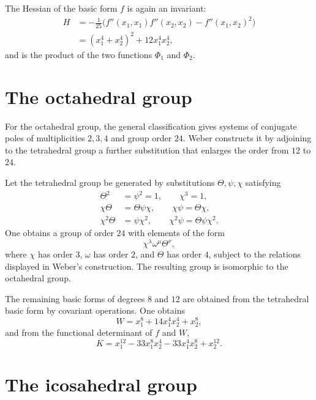 \documentclass[11pt]{article}
\begin{document}
The Hessian of the basic form $f$ is again an invariant:
\begin{align*}
 H&=-\frac1{25}\bigl(f''(x_1,x_1)f''(x_2,x_2)-f''(x_1,x_2)^2\bigr)\\
  &=(x_1^4+x_2^4)^2+12x_1^4x_2^4,
\end{align*}
and is the product of the two functions $\Phi_1$ and $\Phi_2$.

\section{The octahedral group}

For the octahedral group, the general classification gives systems of conjugate poles of multiplicities $2,3,4$ and group order $24$.  Weber constructs it by adjoining to the tetrahedral group a further substitution that enlarges the order from $12$ to $24$.

Let the tetrahedral group be generated by substitutions $\Theta,\psi,\chi$ satisfying
\begin{equation}\label{eq:w9-oct-rel}
\begin{aligned}
 \Theta^2&=\psi^2=1,
 \qquad \chi^3=1,\\
 \chi\Theta&=\Theta\psi\chi,
 \qquad \chi\psi=\Theta\chi,\\
 \chi^2\Theta&=\psi\chi^2,
 \qquad \chi^2\psi=\Theta\psi\chi^2.
\end{aligned}
\end{equation}
One obtains a group of order $24$ with elements of the form
\[
 \chi^\lambda\omega^\mu\Theta^\nu,
\]
where $\chi$ has order $3$, $\omega$ has order $2$, and $\Theta$ has order $4$, subject to the relations displayed in Weber's construction.  The resulting group is isomorphic to the octahedral group.

The remaining basic forms of degrees $8$ and $12$ are obtained from the tetrahedral basic form by covariant operations.  One obtains
\begin{equation}\label{eq:w9-oct-W}
 W=x_1^8+14x_1^4x_2^4+x_2^8,
\end{equation}
and from the functional determinant of $f$ and $W$,
\begin{equation}\label{eq:w9-oct-K}
 K=x_1^{12}-33x_1^8x_2^4-33x_1^4x_2^8+x_2^{12}.
\end{equation}

\section{The icosahedral group}
\end{document}
